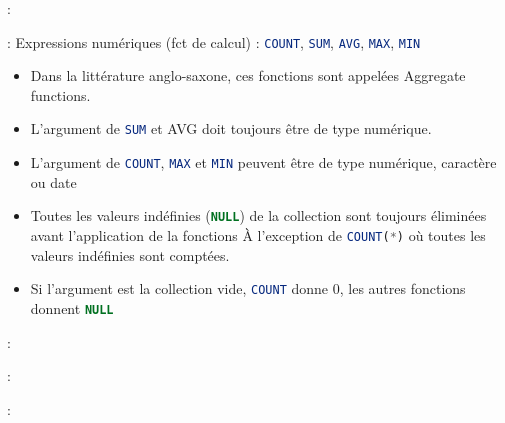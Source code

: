 \documentclass[10pt]{beamer}
\begin{document}
\begin{frame}{\secname : \subsecname}
    
\end{frame}

\begin{frame}[allowframebreaks]{\secname : \subsecname}
    Expressions numériques (fct de calcul) : \lstinline[language=sql]!COUNT!, \lstinline[language=sql]!SUM!, \lstinline[language=sql]!AVG!, \lstinline[language=sql]!MAX!, \lstinline[language=sql]!MIN!
    \begin{itemize}
        \item Dans la littérature anglo-saxone, ces fonctions sont appelées Aggregate functions.
        \item L'argument de \lstinline[language=sql]!SUM! et AVG doit toujours être de type numérique.
        \item L'argument de \lstinline[language=sql]!COUNT!, \lstinline[language=sql]!MAX! et \lstinline[language=sql]!MIN! peuvent être de type numérique, caractère ou date
        \item Toutes les valeurs indéfinies (\lstinline[language=sql]!NULL!) de la collection sont toujours éliminées avant l'application de la fonctions
              À l'exception de \lstinline[language=sql]!COUNT(*)! où toutes les valeurs indéfinies sont comptées.
        \item Si l'argument est la collection vide, \lstinline[language=sql]!COUNT! donne 0, les autres fonctions donnent \lstinline[language=sql]!NULL!
    \end{itemize}
\end{frame}
\begin{frame}{\secname : \subsecname}
    
\end{frame}

\begin{frame}{\secname : \subsecname}
    
\end{frame}

\begin{frame}{\secname : \subsecname}
    
\end{frame}
\end{document}
